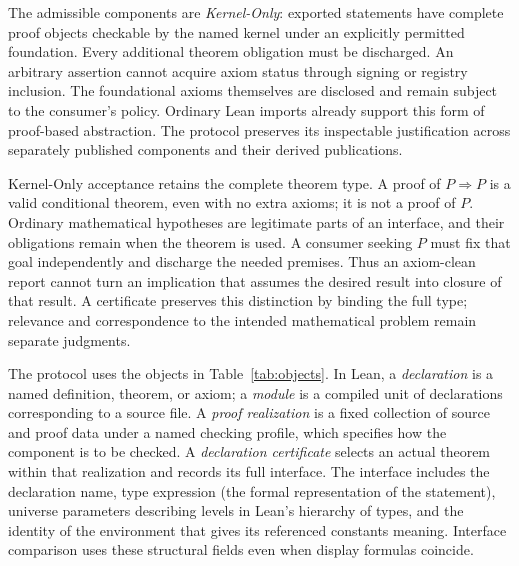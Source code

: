 \documentclass[11pt]{article}
\begin{document}
The admissible components are \emph{Kernel-Only}: exported statements have
complete proof objects checkable by the named kernel under an explicitly
permitted foundation. Every additional theorem obligation must be discharged.
An arbitrary assertion cannot acquire axiom status through signing or registry
inclusion. The foundational axioms themselves are disclosed and remain subject
to the consumer's policy. Ordinary Lean imports already support this form of
proof-based abstraction. The protocol preserves its inspectable justification
across separately published components and their derived publications.

Kernel-Only acceptance retains the complete theorem type. A proof of
$P\Rightarrow P$ is a valid conditional theorem, even with no extra axioms;
it is not a proof of $P$. Ordinary mathematical hypotheses are legitimate
parts of an interface, and their obligations remain when the theorem is used.
A consumer seeking $P$ must fix that goal independently and discharge the
needed premises. Thus an axiom-clean report cannot turn an implication that
assumes the desired result into closure of that result. A certificate preserves
this distinction by binding the full type; relevance and correspondence to the
intended mathematical problem remain separate judgments.

The protocol uses the objects in Table~\ref{tab:objects}. In Lean, a
\emph{declaration} is a named definition, theorem, or axiom; a \emph{module}
is a compiled unit of declarations corresponding to a source file.
A \emph{proof
realization} is a fixed collection of source and proof data under a named
checking profile, which specifies how the component is to be checked.
A \emph{declaration certificate} selects an actual theorem
within that realization and records its full interface. The interface includes
the declaration name, type expression (the formal representation of the statement), universe parameters describing levels
in Lean's hierarchy of types, and the identity of the environment that gives its referenced constants meaning. Interface comparison uses these structural fields even when display formulas
coincide.
\end{document}

